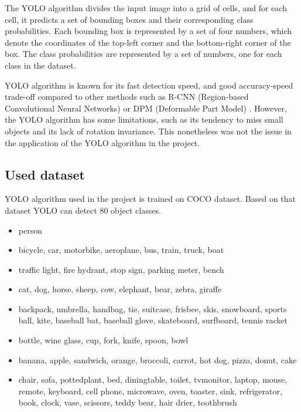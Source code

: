 \documentclass[conference,a4paper]{IEEEtran}
\begin{document}
The YOLO algorithm divides the input image into a grid of cells, and for each cell, it predicts a set of bounding boxes and their corresponding class probabilities. Each bounding box is represented by a set of four numbers, which denote the coordinates of the top-left corner and the bottom-right corner of the box. The class probabilities are represented by a set of numbers, one for each class in the dataset.

YOLO algorithm is known for its fast detection speed, and good accuracy-speed trade-off compared to other methods such as R-CNN (Region-based Convolutional Neural Networks) or DPM (Deformable Part Model) \cite{YOLO_paper}. However, the YOLO algorithm has some limitations, such as its tendency to miss small objects and its lack of rotation invariance. This nonetheless was not the issue in the application of the YOLO algorithm in the project. 

\subsection{Used dataset}
YOLO algorithm used in the project is trained on COCO dataset. Based on that dataset YOLO can detect 80 object classes.
\begin{itemize}
\item person
\item bicycle, car, motorbike, aeroplane, bus, train, truck, boat
\item traffic light, fire hydrant, stop sign, parking meter, bench
\item cat, dog, horse, sheep, cow, elephant, bear, zebra, giraffe
\item backpack, umbrella, handbag, tie, suitcase, frisbee, skis, snowboard, sports ball, kite, baseball bat, baseball glove, skateboard, surfboard, tennis racket
\item bottle, wine glass, cup, fork, knife, spoon, bowl
\item banana, apple, sandwich, orange, broccoli, carrot, hot dog, pizza, donut, cake
\item chair, sofa, pottedplant, bed, diningtable, toilet, tvmonitor, laptop, mouse, remote, keyboard, cell phone, microwave, oven, toaster, sink, refrigerator, book, clock, vase, scissors, teddy bear, hair drier, toothbrush
\end{itemize}
\end{document}
